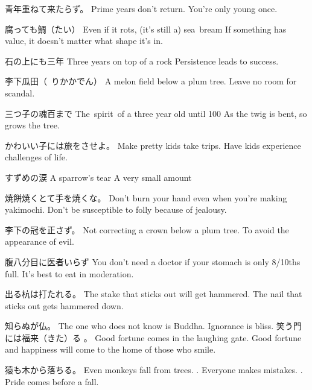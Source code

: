 \par{青年重ねて来たらず。 \hfill\break
Prime years don't return. \hfill\break
You're only young once. }

\par{腐っても鯛（たい） \hfill\break
Even if it rots, (it's still a) sea bream \hfill\break
If something has value, it doesn't matter what shape it's in. }

\par{石の上にも三年 \hfill\break
Three years on top of a rock \hfill\break
Persistence leads to success. }

\par{李下瓜田（ りかかでん） \hfill\break
A melon field below a plum tree. \hfill\break
Leave no room for scandal. }

\par{三つ子の魂百まで \hfill\break
The spirit of a three year old until 100 \hfill\break
As the twig is bent, so grows the tree. }

\par{かわいい子には旅をさせよ。 \hfill\break
Make pretty kids take trips. \hfill\break
Have kids experience challenges of life. }

\par{すずめの涙 \hfill\break
A sparrow's tear \hfill\break
A very small amount }

\par{焼餅焼くとて手を焼くな。 \hfill\break
Don't burn your hand even when you're making yakimochi. \hfill\break
Don't be susceptible to folly because of jealousy. }

\par{李下の冠を正さず。 \hfill\break
Not correcting a crown below a plum tree. \hfill\break
To avoid the appearance of evil. }

\par{腹八分目に医者いらず \hfill\break
You don't need a doctor if your stomach is only 8\slash 10ths full. \hfill\break
It's best to eat in moderation. }

\par{出る杭は打たれる。 \hfill\break
The stake that sticks out will get hammered. \hfill\break
The nail that sticks out gets hammered down. }

\par{知らぬが仏。 \hfill\break
The one who does not know is Buddha. \hfill\break
Ignorance is bliss. }
笑う門には福来（きた）る 。 \hfill\break
Good fortune comes in the laughing gate. \hfill\break
Good fortune and happiness will come to the home of those who smile. 
\par{猿も木から落ちる。 \hfill\break
Even monkeys fall from trees. \hfill{}. Everyone makes mistakes. \hfill{}. Pride comes before a fall. }

